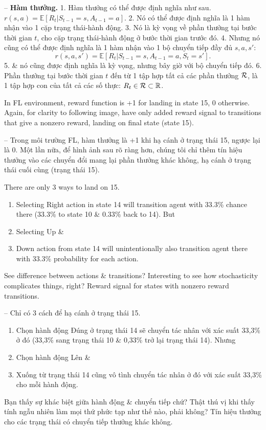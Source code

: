 \documentclass{article}
\begin{document}
\begin{itemize}
\begin{itemize}
        -- {\bf Hàm thưởng.} 1. Hàm thưởng có thể được định nghĩa như sau. $r(s,a) = \mathbb{E}[R_t|S_{t-1} = s,A_{t-1} = a]$. 2. Nó có thể được định nghĩa là 1 hàm nhận vào 1 cặp trạng thái-hành động. 3. Nó là kỳ vọng về phần thưởng tại bước thời gian $t$, cho cặp trạng thái-hành động ở bước thời gian trước đó. 4. Nhưng nó cũng có thể được định nghĩa là 1 hàm nhận vào 1 bộ chuyển tiếp đầy đủ $s,a,s'$:
        \begin{equation*}
            r(s,a,s') = \mathbb{E}[R_t|S_{t-1} = s,A_{t-1} = a,S_t = s'].
        \end{equation*}
        5. \& nó cũng được định nghĩa là kỳ vọng, nhưng bây giờ với bộ chuyển tiếp đó. 6. Phần thưởng tại bước thời gian $t$ đến từ 1 tập hợp tất cả các phần thưởng ${\cal R}$, là 1 tập hợp con của tất cả các số thực: $R_t\in{\cal R}\subset\mathbb{R}$.

        In FL environment, reward function is +1 for landing in state 15, 0 otherwise. Again, for clarity to following image, have only added reward signal to transitions that give a nonzero reward, landing on final state (state 15).

        -- Trong môi trường FL, hàm thưởng là +1 khi hạ cánh ở trạng thái 15, ngược lại là 0. Một lần nữa, để hình ảnh sau rõ ràng hơn, chúng tôi chỉ thêm tín hiệu thưởng vào các chuyển đổi mang lại phần thưởng khác không, hạ cánh ở trạng thái cuối cùng (trạng thái 15).

        There are only 3 ways to land on 15.
        \begin{enumerate}
            \item Selecting Right action in state 14 will transition agent with 33.3\% chance there (33.3\% to state 10 \& 0.33\% back to 14). But
            \item Selecting Up \&
            \item Down action from state 14 will unintentionally also transition agent there with 33.3\% probability for each action.
        \end{enumerate}
        See difference between actions \& transitions? Interesting to see how stochasticity complicates things, right? {\sf Reward signal for states with nonzero reward transitions.}

        -- Chỉ có 3 cách để hạ cánh ở trạng thái 15.
        \begin{enumerate}
            \item Chọn hành động Đúng ở trạng thái 14 sẽ chuyển tác nhân với xác suất 33,3\% ở đó (33,3\% sang trạng thái 10 \& 0,33\% trở lại trạng thái 14). Nhưng
            \item Chọn hành động Lên \&
            \item Xuống từ trạng thái 14 cũng vô tình chuyển tác nhân ở đó với xác suất 33,3\% cho mỗi hành động.
        \end{enumerate}
        Bạn thấy sự khác biệt giữa hành động \& chuyển tiếp chứ? Thật thú vị khi thấy tính ngẫu nhiên làm mọi thứ phức tạp như thế nào, phải không? {\sf Tín hiệu thưởng cho các trạng thái có chuyển tiếp thưởng khác không.}


\end{itemize}
\end{itemize}
\end{document}
